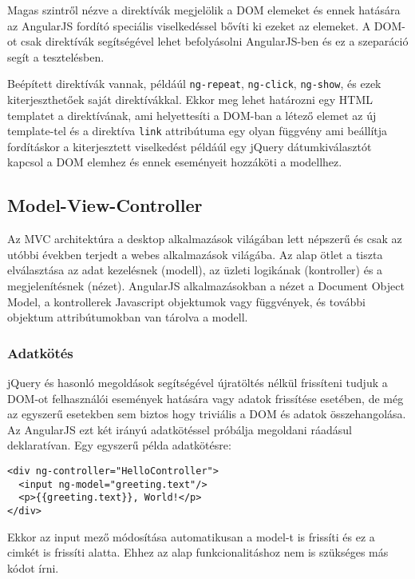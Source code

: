Magas szintről nézve a direktívák megjelölik a DOM elemeket és ennek hatására az AngularJS fordító speciális viselkedéssel bővíti ki ezeket az elemeket. A DOM-ot csak direktívák segítségével lehet befolyásolni AngularJS-ben és ez a szeparáció segít a tesztelésben. 

Beépített direktívák vannak, példáúl \lstinline{ng-repeat}, \lstinline{ng-click}, \lstinline{ng-show}, és ezek kiterjeszthetőek saját direktívákkal. Ekkor meg lehet határozni egy HTML templatet a direktívának, ami helyettesíti a DOM-ban a létező elemet az új template-tel és a direktíva \lstinline{link} attribútuma egy olyan függvény ami beállítja fordításkor a kiterjesztett viselkedést példáúl egy jQuery dátumkiválasztót kapcsol a DOM elemhez és ennek eseményeit hozzáköti a modellhez.


\subsection{Model-View-Controller}

Az MVC architektúra a desktop alkalmazások világában lett népszerű és csak az utóbbi években terjedt a webes alkalmazások világába. Az alap ötlet a tiszta elválasztása az adat kezelésnek (modell), az üzleti logikának (kontroller) és a megjelenítésnek (nézet). AngularJS alkalmazásokban a nézet a Document Object Model, a kontrollerek Javascript objektumok vagy függvények, és további objektum attribútumokban van tárolva a modell.   

\subsubsection{Adatkötés}

jQuery és hasonló megoldások segítségével újratöltés nélkül frissíteni tudjuk a DOM-ot felhasználói események hatására vagy adatok frissítése esetében, de még az egyszerű esetekben sem biztos hogy triviális a DOM és adatok összehangolása. Az AngularJS ezt két irányú adatkötéssel próbálja megoldani ráadásul deklaratívan. Egy egyszerű példa adatkötésre:

\lstset{language=HTML}
\begin{lstlisting}[frame=single]  
<div ng-controller="HelloController">
  <input ng-model="greeting.text"/>
  <p>{{greeting.text}}, World!</p>
</div>
\end{lstlisting}
Ekkor az input mező módosítása automatikusan a model-t is frissíti és ez a cimkét is frissíti alatta. Ehhez az alap funkcionalitáshoz nem is szükséges más kódot írni.


